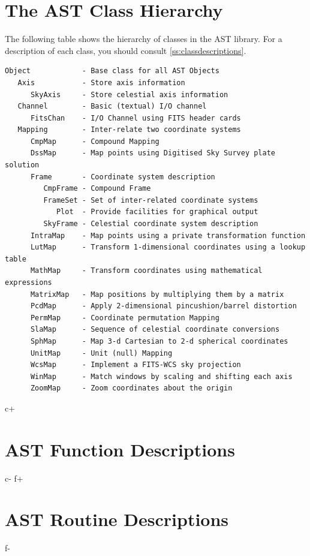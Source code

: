 \documentclass[twoside,11pt]{article}
\newcommand{\appref}[1]{Appendix~\ref{#1}}
\renewcommand{\appref}[1]{\ref{#1}}
\begin{document}

\cleardoublepage
\section{\label{ss:classhierarchy}The AST Class Hierarchy}
The following table shows the hierarchy of classes in the AST library.
For a description of each class, you should consult
\appref{ss:classdescriptions}.

\small
\begin{verbatim}
Object            - Base class for all AST Objects
   Axis           - Store axis information
      SkyAxis     - Store celestial axis information
   Channel        - Basic (textual) I/O channel
      FitsChan    - I/O Channel using FITS header cards
   Mapping        - Inter-relate two coordinate systems
      CmpMap      - Compound Mapping
      DssMap      - Map points using Digitised Sky Survey plate solution
      Frame       - Coordinate system description
         CmpFrame - Compound Frame
         FrameSet - Set of inter-related coordinate systems
            Plot  - Provide facilities for graphical output
         SkyFrame - Celestial coordinate system description
      IntraMap    - Map points using a private transformation function
      LutMap      - Transform 1-dimensional coordinates using a lookup table
      MathMap     - Transform coordinates using mathematical expressions
      MatrixMap   - Map positions by multiplying them by a matrix
      PcdMap      - Apply 2-dimensional pincushion/barrel distortion
      PermMap     - Coordinate permutation Mapping
      SlaMap      - Sequence of celestial coordinate conversions
      SphMap      - Map 3-d Cartesian to 2-d spherical coordinates
      UnitMap     - Unit (null) Mapping
      WcsMap      - Implement a FITS-WCS sky projection
      WinMap      - Match windows by scaling and shifting each axis
      ZoomMap     - Zoom coordinates about the origin
\end{verbatim}
\normalsize

\cleardoublepage
c+
\section{\label{ss:functiondescriptions}AST Function Descriptions}
\small

\normalsize
c-
f+
\section{\label{ss:functiondescriptions}AST Routine Descriptions}
\small

\normalsize
f-
\end{document}
